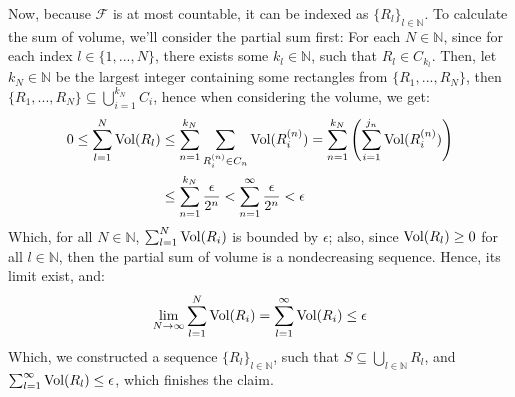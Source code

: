 \documentclass{article}
\begin{document}
Now, because $\mathcal{F}$ is at most countable, it can be indexed as $\{R_l\}_{l\in\mathbb{N}}$. To calculate the sum of volume, we'll consider the partial sum first: For each $N\in\mathbb{N}$, since for each index $l\in \{1,...,N\}$, there exists some $k_l\in \mathbb{N}$, such that $R_l\in C_{k_l}$. Then, let $k_N\in\mathbb{N}$ be the largest integer containing some rectangles from $\{R_1,...,R_N\}$, then $\{R_1,...,R_N\}\subseteq \bigcup_{i=1}^{k_N}C_i$, hence when considering the volume, we get:
\begin{equation}
    \begin{split}
        0\leq \sum_{l=1}^{N}\textmd{Vol}(R_l)&\leq \sum_{n=1}^{k_N}\sum_{R_i^{(n)}\in C_n}\textmd{Vol}(R_i^{(n)}) = \sum_{n=1}^{k_N}\left(\sum_{i=1}^{j_n}\textmd{Vol}(R_i^{(n)})\right) \\
        &\leq \sum_{n=1}^{k_N}\frac{\epsilon}{2^n} < \sum_{n=1}^{\infty}\frac{\epsilon}{2^n}<\epsilon
    \end{split}
\end{equation}
Which, for all $N\in\mathbb{N}$, $\sum_{l=1}^{N}\textmd{Vol}(R_i)$ is bounded by $\epsilon$; also, since $\textmd{Vol}(R_l)\geq 0$ for all $l\in\mathbb{N}$, then the partial sum of volume is a nondecreasing sequence. Hence, its limit exist, and:
\begin{equation}
    \lim_{N\rightarrow\infty}\sum_{l=1}^{N}\textmd{Vol}(R_i) = \sum_{l=1}^{\infty}\textmd{Vol}(R_i) \leq \epsilon
\end{equation}
Which, we constructed a sequence $\{R_l\}_{l\in\mathbb{N}}$, such that $S\subseteq \bigcup_{l\in\mathbb{N}}R_l$, and $\sum_{l=1}^{\infty}\textmd{Vol}(R_l)\leq \epsilon$, which finishes the claim.
\end{document}
